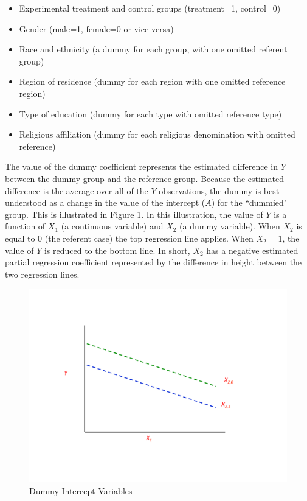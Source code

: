 \documentclass[11pt,openany]{book}\usepackage[]{graphicx}\usepackage[]{color}
\begin{document}
{\begin{itemize}
\item Experimental treatment and control groups (treatment=1, control=0)
\item Gender (male=1, female=0 or vice versa)
\item Race and ethnicity (a dummy for each group, with one omitted referent group)
\item Region of residence (dummy for each region with one omitted reference region)
\item Type of education (dummy for each type with omitted reference type)
\item Religious affiliation (dummy for each religious denomination with omitted reference)
\end{itemize}

The value of the dummy coefficient represents the estimated difference in $Y$ between the dummy group and the reference group. Because the estimated difference is the average over all of the $Y$ observations, the dummy is best understood as a change in the value of the intercept ($A$) for the ``dummied" group. This is illustrated in Figure \ref{fig:dum}. In this illustration, the value of $Y$  is a function of $X_1$ (a continuous variable) and $X_2$ (a dummy variable). When $X_2$ is equal to 0 (the referent case) the top regression line applies. When $X_2 = 1$, the value of $Y$ is reduced to the bottom line. In short, $X_2$ has a negative estimated partial regression coefficient represented by the difference in height between the two regression lines.

\begin{figure}
  \centering
  \includegraphics[width=5in]{14_Topics/dummy.pdf}%
  \caption{Dummy Intercept Variables \label{fig:dum}}
\end{figure}

}
\end{document}
